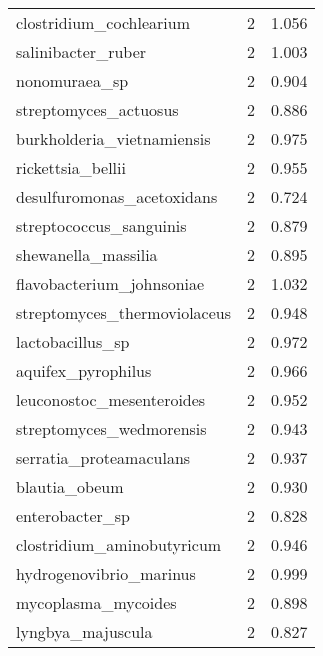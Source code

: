 \begin{tabular}{lrr}
                     clostridium\_cochlearium &                   2 &     1.056 \\
                          salinibacter\_ruber &                   2 &     1.003 \\
                               nonomuraea\_sp &                   2 &     0.904 \\
                       streptomyces\_actuosus &                   2 &     0.886 \\
                  burkholderia\_vietnamiensis &                   2 &     0.975 \\
                           rickettsia\_bellii &                   2 &     0.955 \\
                  desulfuromonas\_acetoxidans &                   2 &     0.724 \\
                     streptococcus\_sanguinis &                   2 &     0.879 \\
                         shewanella\_massilia &                   2 &     0.895 \\
                   flavobacterium\_johnsoniae &                   2 &     1.032 \\
                streptomyces\_thermoviolaceus &                   2 &     0.948 \\
                            lactobacillus\_sp &                   2 &     0.972 \\
                          aquifex\_pyrophilus &                   2 &     0.966 \\
                   leuconostoc\_mesenteroides &                   2 &     0.952 \\
                    streptomyces\_wedmorensis &                   2 &     0.943 \\
                     serratia\_proteamaculans &                   2 &     0.937 \\
                               blautia\_obeum &                   2 &     0.930 \\
                             enterobacter\_sp &                   2 &     0.828 \\
                  clostridium\_aminobutyricum &                   2 &     0.946 \\
                     hydrogenovibrio\_marinus &                   2 &     0.999 \\
                         mycoplasma\_mycoides &                   2 &     0.898 \\
                           lyngbya\_majuscula &                   2 &     0.827 \\

\end{tabular}
